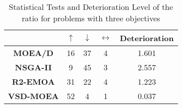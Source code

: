 \begin{table}[t]
\caption{\scriptsize Statistical Tests and Deterioration Level of the \HV{} ratio for problems with three objectives}
\label{tab:Tests_HV_3obj}
\centering
\begin{scriptsize}
\begin{tabular}{c c|c|c|c}
\cline{2-5}
                                        & \textbf{$\uparrow$} & \textbf{$\downarrow$} & \textbf{$\leftrightarrow$} & \textbf{Deterioration} \\ \hline
\multicolumn{1}{c|}{\textbf{MOEA/D}}   & 16                  & 37                    & 4                          & 1.601         \\ \hline
\multicolumn{1}{c|}{\textbf{NSGA-II}}  & 9                   & 45                    & 3                          & 2.557         \\ \hline
\multicolumn{1}{c|}{\textbf{R2-EMOA}}  & 31                  & 22                    & 4                          & 1.223         \\ \hline
\multicolumn{1}{c|}{\textbf{VSD-MOEA}} & 52                  & 4                     & 1                          & 0.037         \\ \hline
\end{tabular}%
\end{scriptsize}
\end{table}
%
